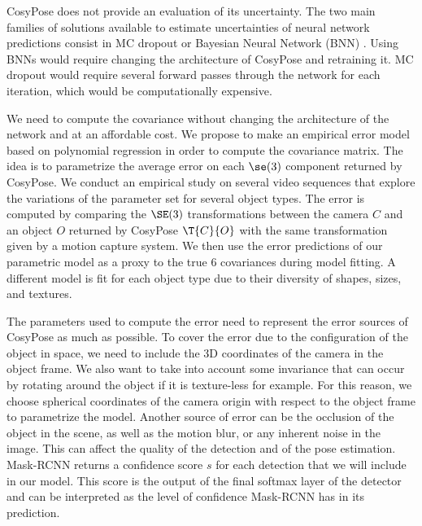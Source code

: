CosyPose does not provide an evaluation of its uncertainty.
%
The two main families of solutions available to estimate uncertainties of neural network predictions consist in MC dropout \cite{gal2016dropout} 
or Bayesian Neural Network (BNN) \cite{jospin2020hands}. Using BNNs would require changing the architecture of CosyPose and retraining it. 
MC dropout would require several forward passes through the network for each iteration, which would be computationally expensive. 

We need to compute the covariance without changing the architecture of the network and at an affordable cost. 
We propose to make an empirical error model based on polynomial regression in order to compute the covariance matrix. 
The idea is to parametrize the average error on each $\se(3)$ component returned by CosyPose. We conduct an empirical study on several video 
sequences that explore the variations of the parameter set for several object types. The error is computed by comparing the $\SE(3)$ transformations 
between the camera $C$ and an object $O$ returned by CosyPose $\T{C}{O}$ with the same transformation given by a motion capture system. 
We then use the error predictions of our parametric model as a proxy to the true 6 covariances during model fitting. 
A different model is fit for each object type due to their diversity of shapes, sizes, and textures.

The parameters used to compute the error need to represent the error sources of CosyPose as much as possible. 
To cover the error due to the configuration of the object in space, we need to include the 3D coordinates of the camera in the object frame. 
We also want to take into account some invariance that can occur by rotating around the object if it is texture-less for example. 
For this reason, we choose spherical coordinates of the camera origin with respect to the object frame to parametrize the model. 
Another source of error can be the occlusion of the object in the scene, as well as the motion blur, or any inherent noise in the image. 
This can affect the quality of the detection and of the pose estimation. Mask-RCNN returns a confidence score $s$ for each detection 
that we will include in our model. This score is the output of the final softmax layer of the detector and can be interpreted
as the level of confidence Mask-RCNN has in its prediction.


